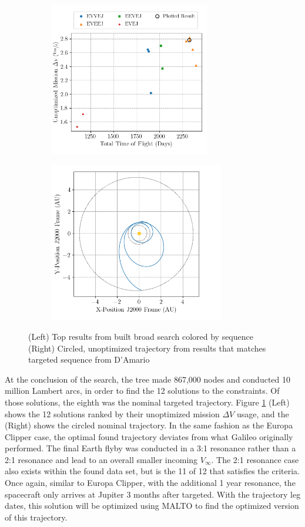 \documentclass[letterpaper, preprint, paper,11pt]{AAS}	%
\begin{document}
\begin{figure}[htb]
    \begin{subfigure}
        \centering\includegraphics[width=2.75in]{./fig/galileoResults.png}
    \end{subfigure}
    \begin{subfigure}
        \centering\includegraphics[width=3in]{./fig/galileoMCTS.png}
    \end{subfigure}
    \caption{(Left) Top results from built broad search colored by sequence\hspace{1em} (Right) Circled, unoptimized trajectory from results that matches targeted sequence from D'Amario \cite{DAmario1992}}
    \label{fig:galiResults}
\end{figure}

At the conclusion of the search, the tree made 867,000 nodes and conducted 10 million Lambert arcs, in order to find the 12 solutions to the constraints. Of those solutions, the eighth was the nominal targeted trajectory. Figure \ref*{fig:galiResults} (Left) shows the 12 solutions ranked by their unoptimized mission $\Delta V$ usage, and the (Right) shows the circled nominal trajectory. In the same fashion as the Europa Clipper case, the optimal found trajectory deviates from what Galileo originally performed. The final Earth flyby was conducted in a 3:1 resonance rather than a 2:1 resonance and lead to an overall smaller incoming $V_\infty$. The 2:1 resonance case also exists within the found data set, but is the 11 of 12 that satisfies the criteria. Once again, similar to Europa Clipper, with the additional 1 year resonance, the spacecraft only arrives at Jupiter 3 months after targeted. With the trajectory leg dates, this solution will be optimized using MALTO to find the optimized version of this trajectory. 
\end{document}
